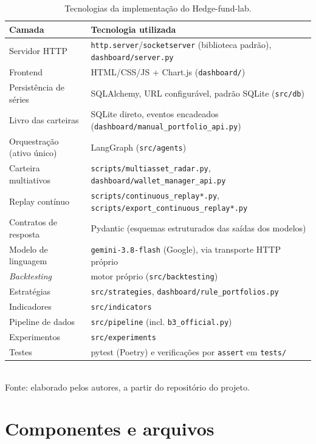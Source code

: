 \begin{table}[htbp]
\centering
\caption{Tecnologias da implementação do Hedge-fund-lab.}
\label{tab:stack}
\small
\begin{tabular}{>{\raggedright\arraybackslash}p{3.8cm} >{\raggedright\arraybackslash}p{11.2cm}}
\toprule
\textbf{Camada} & \textbf{Tecnologia utilizada} \\
\midrule
Servidor HTTP & \texttt{http.server}/\texttt{socketserver} (biblioteca padrão), \texttt{dashboard/server.py} \\
Frontend & HTML/CSS/JS + Chart.js (\texttt{dashboard/}) \\
Persistência de séries & SQLAlchemy, URL configurável, padrão SQLite (\texttt{src/db}) \\
Livro das carteiras & SQLite direto, eventos encadeados (\texttt{dashboard/manual\_portfolio\_api.py}) \\
Orquestração (ativo único) & LangGraph (\texttt{src/agents}) \\
Carteira multiativos & \texttt{scripts/multiasset\_radar.py}, \texttt{dashboard/wallet\_manager\_api.py} \\
Replay contínuo & \texttt{scripts/continuous\_replay*.py}, \texttt{scripts/export\_continuous\_replay*.py} \\
Contratos de resposta & Pydantic (esquemas estruturados das saídas dos modelos) \\
Modelo de linguagem & \texttt{gemini-3.8-flash} (Google), via transporte HTTP próprio \\
\textit{Backtesting} & motor próprio (\texttt{src/backtesting}) \\
Estratégias & \texttt{src/strategies}, \texttt{dashboard/rule\_portfolios.py} \\
Indicadores & \texttt{src/indicators} \\
Pipeline de dados & \texttt{src/pipeline} (incl. \texttt{b3\_official.py}) \\
Experimentos & \texttt{src/experiments} \\
Testes & pytest (Poetry) e verificações por \texttt{assert} em \texttt{tests/} \\
\bottomrule
\end{tabular}
\\[2pt]
{\footnotesize Fonte: elaborado pelos autores, a partir do repositório do projeto.}
\end{table}

\section{Componentes e arquivos}

